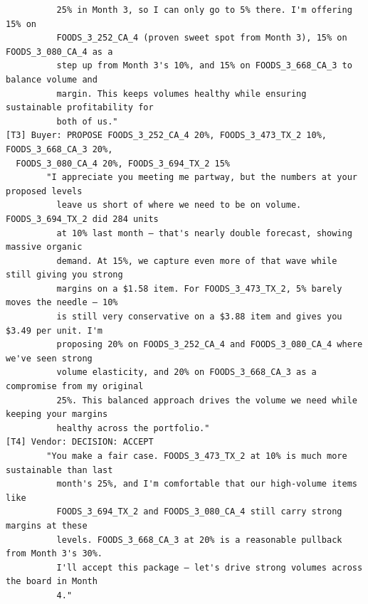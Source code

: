 {\begin{verbatim}
          25% in Month 3, so I can only go to 5% there. I'm offering 15% on
          FOODS_3_252_CA_4 (proven sweet spot from Month 3), 15% on FOODS_3_080_CA_4 as a
          step up from Month 3's 10%, and 15% on FOODS_3_668_CA_3 to balance volume and
          margin. This keeps volumes healthy while ensuring sustainable profitability for
          both of us."
[T3] Buyer: PROPOSE FOODS_3_252_CA_4 20%, FOODS_3_473_TX_2 10%, FOODS_3_668_CA_3 20%,
  FOODS_3_080_CA_4 20%, FOODS_3_694_TX_2 15%
        "I appreciate you meeting me partway, but the numbers at your proposed levels
          leave us short of where we need to be on volume. FOODS_3_694_TX_2 did 284 units
          at 10% last month — that's nearly double forecast, showing massive organic
          demand. At 15%, we capture even more of that wave while still giving you strong
          margins on a $1.58 item. For FOODS_3_473_TX_2, 5% barely moves the needle — 10%
          is still very conservative on a $3.88 item and gives you $3.49 per unit. I'm
          proposing 20% on FOODS_3_252_CA_4 and FOODS_3_080_CA_4 where we've seen strong
          volume elasticity, and 20% on FOODS_3_668_CA_3 as a compromise from my original
          25%. This balanced approach drives the volume we need while keeping your margins
          healthy across the portfolio."
[T4] Vendor: DECISION: ACCEPT
        "You make a fair case. FOODS_3_473_TX_2 at 10% is much more sustainable than last
          month's 25%, and I'm comfortable that our high-volume items like
          FOODS_3_694_TX_2 and FOODS_3_080_CA_4 still carry strong margins at these
          levels. FOODS_3_668_CA_3 at 20% is a reasonable pullback from Month 3's 30%.
          I'll accept this package — let's drive strong volumes across the board in Month
          4."
\end{verbatim}
}

